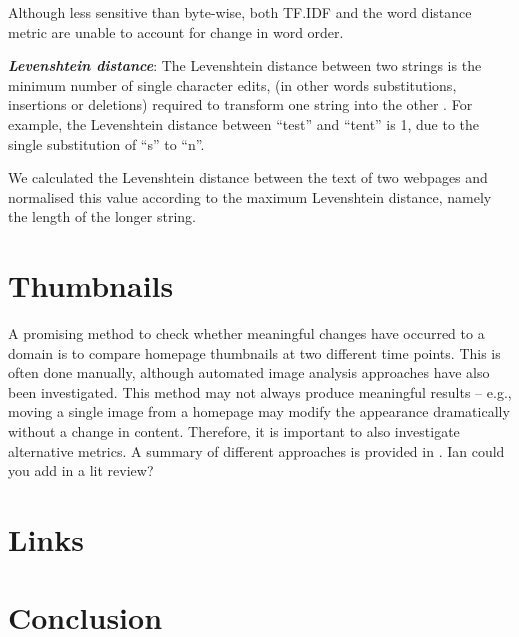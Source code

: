 \documentclass[10pt, a4paper]{article}
\begin{document}
Although less sensitive than byte-wise, both TF.IDF and the word distance metric are unable to account for change in word order. 

\textit{\textbf{Levenshtein distance}}:
The Levenshtein distance between two strings is the minimum number of single character edits, (in other words substitutions, insertions or deletions) required to transform one string into the other \cite{levenshtein1996}. For example, the Levenshtein distance between ``test'' and ``tent'' is 1, due to the single substitution of ``s'' to ``n''.

We calculated the Levenshtein distance between the text of two webpages and normalised this value according to the maximum Levenshtein distance, namely the length of the longer string. 




\section{Thumbnails}
A promising method to check whether meaningful changes have occurred to a domain is to compare homepage thumbnails at two different time points. This is often done manually, although automated image analysis approaches have also been investigated. This method may not always produce meaningful results -- e.g., moving a single image from a homepage may modify the appearance dramatically without a change in content. Therefore, it is important to also investigate alternative metrics. A summary of different approaches is provided in \cite{kwon2006precise}. {\color{red} Ian could you add in a lit review?}

\section{Links}

\section{Conclusion}



\end{document}
